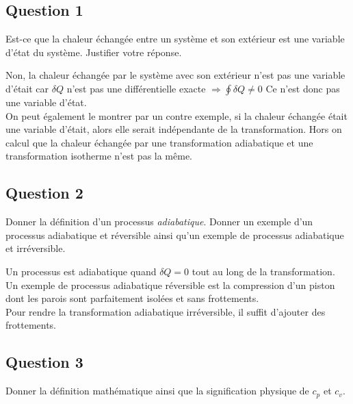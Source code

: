 
\subsection*{Question 1}
Est-ce que la chaleur échangée entre un système et son extérieur est une variable d'état du système. Justifier votre réponse.


\begin{tcolorbox}
    Non, la chaleur échangée par le système avec son extérieur 
    n'est pas une variable d'était car $\delta Q$ n'est pas une différentielle exacte $\Rightarrow \oint \delta Q \neq 0$
    Ce n'est donc pas une variable d'état.\\
    
    On peut également le montrer par un contre exemple, si la chaleur échangée était une variable d'était, alors elle serait indépendante de la transformation.
    Hors on calcul que la chaleur échangée par une transformation adiabatique et une transformation isotherme n'est pas la même.
\end{tcolorbox}

\subsection*{Question 2}

Donner la définition d'un processus \textit{adiabatique}. Donner un exemple d'un processus adiabatique et réversible ainsi qu'un exemple de processus adiabatique et irréversible.

\begin{tcolorbox}
    Un processus est adiabatique quand $\delta Q = 0$ tout au long de la transformation.\\

    Un exemple de processus adiabatique réversible est la compression d'un piston dont les parois sont parfaitement isolées et sans frottements.\\

    Pour rendre la transformation adiabatique irréversible, il suffit d'ajouter des frottements.
\end{tcolorbox}

\subsection*{Question 3}

Donner la définition mathématique ainsi que la signification physique de $c_p$ et $c_v$.

